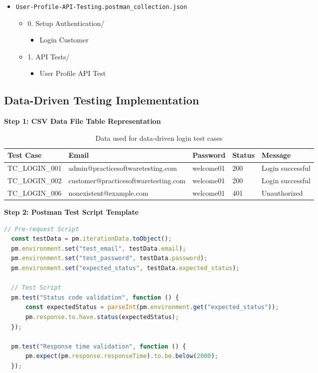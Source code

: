 \documentclass[12pt,a4paper]{article}
\begin{document}
\begin{itemize}
\begin{itemize}
          \item \texttt{User-Profile-API-Testing.postman\_collection.json}
          \begin{itemize}
              \item 0. Setup Authentication/
              \begin{itemize}
                  \item Login Customer
              \end{itemize}
              \item 1. API Tests/
              \begin{itemize}
                  \item User Profile API Test
              \end{itemize}
          \end{itemize}
      \end{itemize}
  \end{itemize}



  \subsection{Data-Driven Testing Implementation}

  \textbf{Step 1: CSV Data File Table Representation}

  \begin{table}[h!]
  \centering
  \begin{tabularx}{\textwidth}{|l|X|p{2cm}|p{1.5cm}|X|}
  \hline
  \textbf{Test Case} & \textbf{Email} & \textbf{Password} & \textbf{Status} & \textbf{Message} \\
  \hline
  TC\_LOGIN\_001 & admin@practicesoftwaretesting.com & welcome01 & 200 & Login successful \\
  \hline
  TC\_LOGIN\_002 & customer@practicesoftwaretesting.com & welcome01 & 200 & Login successful \\
  \hline
  TC\_LOGIN\_006 & nonexistent@example.com & welcome01 & 401 & Unauthorized \\
  \hline
  \end{tabularx}
  \caption{Data used for data-driven login test cases}
  \end{table}

  \textbf{Step 2: Postman Test Script Template}

  \begin{lstlisting}[language=javascript]
  // Pre-request Script
  const testData = pm.iterationData.toObject();
  pm.environment.set("test_email", testData.email);
  pm.environment.set("test_password", testData.password);
  pm.environment.set("expected_status", testData.expected_status);

  // Test Script
  pm.test("Status code validation", function () {
      const expectedStatus = parseInt(pm.environment.get("expected_status"));
      pm.response.to.have.status(expectedStatus);
  });

  pm.test("Response time validation", function () {
      pm.expect(pm.response.responseTime).to.be.below(2000);
  });

  \end{lstlisting}
\end{document}
